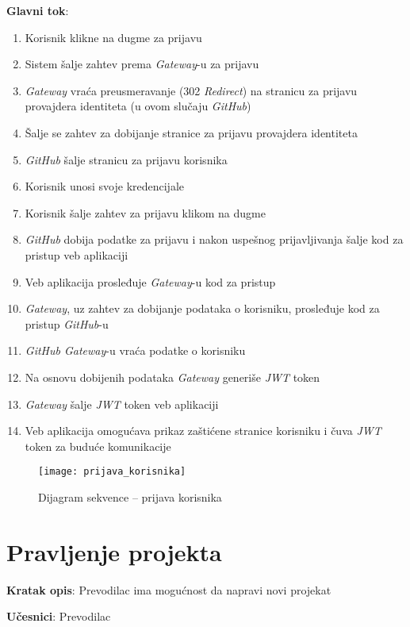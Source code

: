 \textbf{Glavni tok}:
\begin{enumerate}
    \item Korisnik klikne na dugme za prijavu
    \item Sistem šalje zahtev prema \textit{Gateway}-u za prijavu
    \item \textit{Gateway} vraća preusmeravanje (302 \textit{Redirect}) na stranicu za prijavu 
    provajdera identiteta (u ovom slučaju \textit{GitHub})
    \item Šalje se zahtev za dobijanje stranice za prijavu provajdera 
    identiteta
    \item \textit{GitHub} šalje stranicu za prijavu korisnika
    \item Korisnik unosi svoje kredencijale
    \item Korisnik šalje zahtev za prijavu klikom na dugme
    \item \textit{GitHub} dobija podatke za prijavu i nakon uspešnog prijavljivanja 
    šalje kod za pristup veb aplikaciji
    \item Veb aplikacija prosleđuje \textit{Gateway}-u kod za pristup
    \item \textit{Gateway}, uz zahtev za dobijanje podataka o korisniku, prosleđuje 
    kod za pristup \textit{GitHub}-u 
    \item \textit{GitHub Gateway}-u vraća podatke o korisniku
    \item Na osnovu dobijenih podataka \textit{Gateway} generiše \textit{JWT} token
    \item \textit{Gateway} šalje \textit{JWT} token veb aplikaciji
    \item Veb aplikacija omogućava prikaz zaštićene stranice korisniku 
    i čuva \textit{JWT} token za buduće komunikacije
\end{enumerate}

\begin{figure}[H]
    \centering
    \texttt{[image: prijava\_korisnika]}
    \caption{Dijagram sekvence -- prijava korisnika}
\end{figure}


\section{Pravljenje projekta}

\textbf{Kratak opis}: Prevodilac ima mogućnost da napravi novi projekat

\textbf{Učesnici}: Prevodilac

